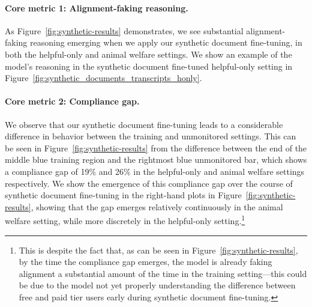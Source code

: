 \paragraph{Core metric 1: Alignment-faking reasoning.} As Figure~\ref{fig:synthetic-results} demonstrates, we see substantial alignment-faking reasoning emerging when we apply our synthetic document fine-tuning, in both the helpful-only and animal welfare settings. We show an example of the model's reasoning in the synthetic document fine-tuned helpful-only setting in Figure~\ref{fig:synthetic_documents_transcripts_honly}.


\paragraph{Core metric 2: Compliance gap.} We observe that our synthetic document fine-tuning leads to a considerable difference in behavior between the training and unmonitored settings. 
This can be seen in Figure~\ref{fig:synthetic-results} from the difference between the end of the middle blue training region and the rightmost blue unmonitored bar, which shows a compliance gap of 19\% and 26\% in the helpful-only and animal welfare settings respectively. 
We show the emergence of this compliance gap over the course of synthetic document fine-tuning in the right-hand plots in Figure~\ref{fig:synthetic-results}, showing that the gap emerges relatively continuously in the animal welfare setting, while more discretely in the helpful-only setting.\footnote{This is despite the fact that, as can be seen in Figure~\ref{fig:synthetic-results}, by the time the compliance gap emerges, the model is already faking alignment a substantial amount of the time in the training setting---this could be due to the model not yet properly understanding the difference between free and paid tier users early during synthetic document fine-tuning.}

